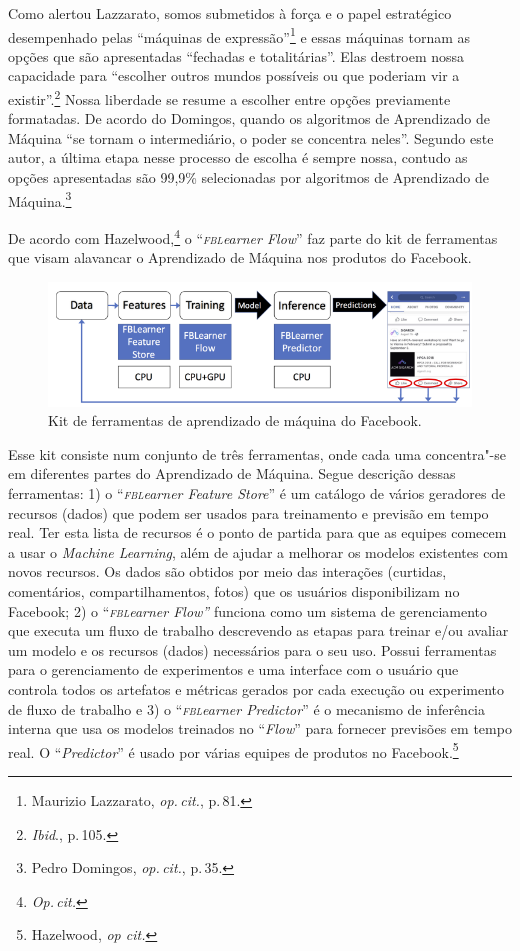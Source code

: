 Como alertou Lazzarato, somos submetidos à força e o papel
estratégico desempenhado pelas ``máquinas de expressão''\footnote{Maurizio Lazzarato, \textit{op.\,cit.}, p.\,81.} e essas
máquinas tornam as opções que são apresentadas ``fechadas e
totalitárias''. Elas destroem nossa capacidade para ``escolher outros
mundos possíveis ou que poderiam vir a existir''.\footnote{\textit{Ibid}., p.\,105.} Nossa
liberdade se resume a escolher entre opções previamente formatadas. De
acordo do Domingos, quando os algoritmos de Aprendizado de
Máquina ``se tornam o intermediário, o poder se concentra neles''.
Segundo este autor, a última etapa nesse processo de escolha é sempre
nossa, contudo as opções apresentadas são 99,9\% selecionadas por
algoritmos de Aprendizado de Máquina.\footnote{Pedro Domingos, \textit{op.\,cit.}, p.\,35.}

De acordo com Hazelwood,\footnote{\textit{Op.\,cit.}} o ``\emph{\textsc{fbl}earner Flow}'' faz parte do kit de ferramentas que visam alavancar o Aprendizado de Máquina
nos produtos do Facebook.

\begin{figure}[!ht]
\includegraphics[width=\textwidth]{./imgs/grafico3.png}
\caption{\formular\footnotesize{Kit de ferramentas de aprendizado de máquina do Facebook.\protect\footnotemark}}
\end{figure}


Esse kit consiste num conjunto de três ferramentas, onde cada uma
concentra"-se em diferentes partes do Aprendizado de Máquina. Segue
descrição dessas ferramentas: 1) o ``\emph{\textsc{fbl}earner Feature Store}'' é
um catálogo de vários geradores de recursos (dados) que podem ser usados
para treinamento e previsão em tempo real. Ter esta lista de recursos é
o ponto de partida para que as equipes comecem a usar o \emph{Machine
Learning}, além de ajudar a melhorar os modelos existentes com novos
recursos. Os dados são obtidos por meio das interações (curtidas,
comentários, compartilhamentos, fotos) que os usuários disponibilizam no
Facebook; 2) o ``\emph{\textsc{fbl}earner Flow''} funciona como um sistema de
gerenciamento que executa um fluxo de trabalho descrevendo as etapas
para treinar e/ou avaliar um modelo e os recursos (dados) necessários
para o seu uso. Possui ferramentas para o gerenciamento de experimentos
e uma interface com o usuário que controla todos os artefatos e métricas
gerados por cada execução ou experimento de fluxo de trabalho e 3) o
``\emph{\textsc{fbl}earner Predictor}'' é o mecanismo de inferência interna que
usa os modelos treinados no ``\emph{Flow}'' para fornecer previsões em
tempo real. O ``\emph{Predictor}'' é usado por várias equipes de
produtos no Facebook.\footnote{Hazelwood, \emph{op cit.}}

